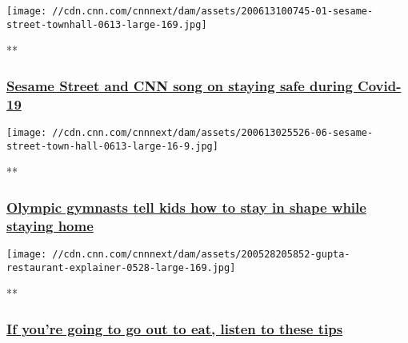 \href{/videos/health/2020/06/13/sesame-street-cnn-coronavirus-town-hall-opening-song-vpx.cnn/video/playlists/cnn-coronavirus-town-hall/}{}

\texttt{[image: //cdn.cnn.com/cnnnext/dam/assets/200613100745-01-sesame-street-townhall-0613-large-169.jpg]}

**

\hypertarget{sesame-street-and-cnn-song-on-staying-safe-during-covid-19}{%
\subsubsection{\texorpdfstring{\href{/videos/health/2020/06/13/sesame-street-cnn-coronavirus-town-hall-opening-song-vpx.cnn/video/playlists/cnn-coronavirus-town-hall/}{Sesame
Street and CNN song on staying safe during
Covid-19}}{Sesame Street and CNN song on staying safe during Covid-19}}\label{sesame-street-and-cnn-song-on-staying-safe-during-covid-19}}

\href{/videos/health/2020/06/13/simone-biles-laurie-hernandez-sesame-street-coronavirus-town-hall-vpx.cnn/video/playlists/cnn-coronavirus-town-hall/}{}

\texttt{[image: //cdn.cnn.com/cnnnext/dam/assets/200613025526-06-sesame-street-town-hall-0613-large-16-9.jpg]}

**

\hypertarget{olympic-gymnasts-tell-kids-how-to-stay-in-shape-while-staying-home}{%
\subsubsection{\texorpdfstring{\href{/videos/health/2020/06/13/simone-biles-laurie-hernandez-sesame-street-coronavirus-town-hall-vpx.cnn/video/playlists/cnn-coronavirus-town-hall/}{Olympic
gymnasts tell kids how to stay in shape while staying
home}}{Olympic gymnasts tell kids how to stay in shape while staying home}}\label{olympic-gymnasts-tell-kids-how-to-stay-in-shape-while-staying-home}}

\href{/videos/health/2020/05/29/gupta-dining-out-restaurant-explainer-coronavirus-town-hall-vpx.cnn/video/playlists/cnn-coronavirus-town-hall/}{}

\texttt{[image: //cdn.cnn.com/cnnnext/dam/assets/200528205852-gupta-restaurant-explainer-0528-large-169.jpg]}

**

\hypertarget{if-youre-going-to-go-out-to-eat-listen-to-these-tips}{%
\subsubsection{\texorpdfstring{\href{/videos/health/2020/05/29/gupta-dining-out-restaurant-explainer-coronavirus-town-hall-vpx.cnn/video/playlists/cnn-coronavirus-town-hall/}{If
you're going to go out to eat, listen to these
tips}}{If you're going to go out to eat, listen to these tips}}\label{if-youre-going-to-go-out-to-eat-listen-to-these-tips}}

